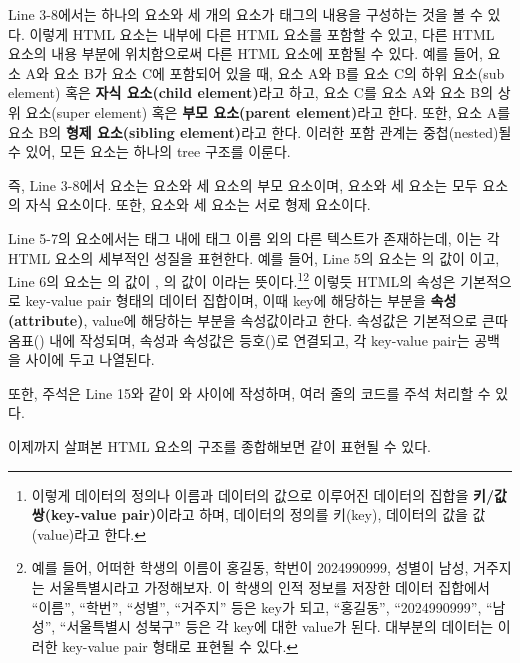 Line 3-8에서는 하나의  요소와 세 개의  요소가  태그의 내용을 구성하는 것을 볼 수 있다. 이렇게 HTML 요소는 내부에 다른 HTML 요소를 포함할 수 있고, 다른 HTML 요소의 내용 부분에 위치함으로써 다른 HTML 요소에 포함될 수 있다. 예를 들어, 요소 A와 요소 B가 요소 C에 포함되어 있을 때, 요소 A와 B를 요소 C의 하위 요소(sub element) 혹은 \textbf{자식 요소(child element)}라고 하고, 요소 C를 요소 A와 요소 B의 상위 요소(super element) 혹은 \textbf{부모 요소(parent element)}라고 한다. 또한, 요소 A를 요소 B의 \textbf{형제 요소(sibling element)}라고 한다. 이러한 포함 관계는 중첩(nested)될 수 있어, 모든 요소는 하나의 tree 구조를 이룬다.

즉, Line 3-8에서  요소는  요소와 세  요소의 부모 요소이며,  요소와 세  요소는 모두  요소의 자식 요소이다. 또한,  요소와 세  요소는 서로 형제 요소이다.

Line 5-7의  요소에서는 태그 내에 태그 이름 외의 다른 텍스트가 존재하는데, 이는 각 HTML 요소의 세부적인 성질을 표현한다. 예를 들어, Line 5의  요소는 의 값이 이고, Line 6의  요소는 의 값이 , 의 값이 이라는 뜻이다.\footnote{이렇게 데이터의 정의나 이름과 데이터의 값으로 이루어진 데이터의 집합을 \textbf{키/값 쌍(key-value pair)}이라고 하며, 데이터의 정의를 키(key), 데이터의 값을 값(value)라고 한다.}\footnote{예를 들어, 어떠한 학생의 이름이 홍길동, 학번이 2024990999, 성별이 남성, 거주지는 서울특별시라고 가정해보자. 이 학생의 인적 정보를 저장한 데이터 집합에서 ``이름'', ``학번'', ``성별'', ``거주지'' 등은 key가 되고, ``홍길동'', ``2024990999'', ``남성'', ``서울특별시 성북구'' 등은 각 key에 대한 value가 된다. 대부분의 데이터는 이러한 key-value pair 형태로 표현될 수 있다.} 이렇듯 HTML의 속성은 기본적으로 key-value pair 형태의 데이터 집합이며, 이때 key에 해당하는 부분을 \textbf{속성(attribute)}, value에 해당하는 부분을 속성값이라고 한다. 속성값은 기본적으로 큰따옴표() 내에 작성되며, 속성과 속성값은 등호(\cd{=})로 연결되고, 각 key-value pair는 공백을 사이에 두고 나열된다.

또한, 주석은 Line 15와 같이 \cd{<!--}와 \cd{-->} 사이에 작성하며, 여러 줄의 코드를 주석 처리할 수 있다.

이제까지 살펴본 HTML 요소의 구조를 종합해보면 \와 같이 표현될 수 있다.

    {}

